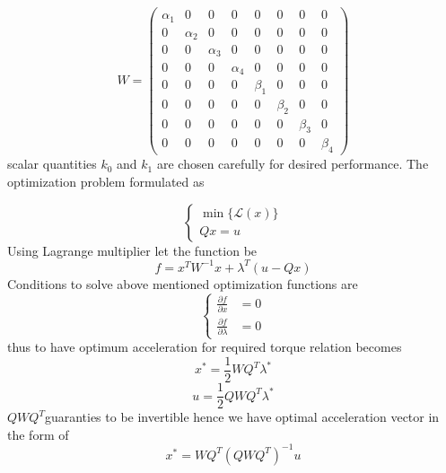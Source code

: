 \begin{equation}
W=\begin{pmatrix}
\alpha _{1} & 0 & 0 & 0 & 0 & 0 & 0 & 0\\
0 & \alpha _{2} & 0 & 0 & 0 & 0 & 0 & 0\\
0 & 0 & \alpha _{3} & 0 & 0 & 0 & 0 & 0\\
0 & 0 & 0 & \alpha _{4} & 0 & 0 & 0 & 0\\
0 & 0 & 0 & 0 & \beta _{1} & 0 & 0 & 0\\
0 & 0 & 0 & 0 & 0 & \beta _{2} & 0 & 0\\
0 & 0 & 0 & 0 & 0 & 0 & \beta _{3} & 0\\
0 & 0 & 0 & 0 & 0 & 0 & 0 & \beta _{4}
\end{pmatrix}
\end{equation}
scalar quantities $\displaystyle k_{0}$ and $\displaystyle k_{1}$ are chosen carefully for desired performance. The optimization problem formulated as


\begin{equation}
\begin{cases}
\min\{\mathcal{L}( x)\}\\
Qx=u
\end{cases}
\end{equation}
Using Lagrange multiplier let the function be
\begin{equation}
f=x^{T} W^{-1} x+\lambda ^{T}( u -Qx)
\end{equation}
Conditions to solve above mentioned optimization functions are
\begin{equation}
\begin{cases}
\frac{\partial f}{\partial x} & =0\\
\frac{\partial f}{\partial \lambda } & =0
\end{cases}
\end{equation}
thus to have optimum acceleration for required torque relation becomes
\begin{equation}
x^{*} =\frac{1}{2} WQ^{T} \lambda ^{*}
\end{equation}
\begin{equation}
u =\frac{1}{2} QWQ^{T} \lambda ^{*}
\end{equation}
$\displaystyle QWQ^{T}$guaranties to be invertible hence we have optimal acceleration vector in the form of
\begin{equation}
x^{*} =WQ^{T}\left( QWQ^{T}\right)^{-1} u
\end{equation}


